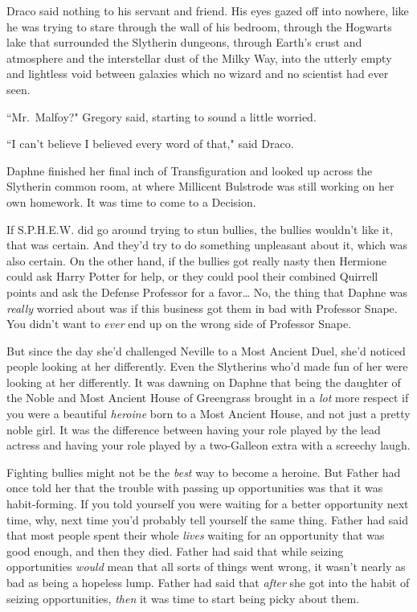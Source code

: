 Draco said nothing to his servant and friend. His eyes gazed off into nowhere, like he was trying to stare through the wall of his bedroom, through the Hogwarts lake that surrounded the Slytherin dungeons, through Earth's crust and atmosphere and the interstellar dust of the Milky Way, into the utterly empty and lightless void between galaxies which no wizard and no scientist had ever seen.

``Mr.~Malfoy?" Gregory said, starting to sound a little worried.

``I can't believe I believed every word of that," said Draco.

\later

Daphne finished her final inch of Transfiguration and looked up across the Slytherin common room, at where Millicent Bulstrode was still working on her own homework. It was time to come to a Decision.

If S.P.H.E.W. did go around trying to stun bullies, the bullies wouldn't like it, that was certain. And they'd try to do something unpleasant about it, which was also certain. On the other hand, if the bullies got really nasty then Hermione could ask Harry Potter for help, or they could pool their combined Quirrell points and ask the Defense Professor for a favor{\ldots} No, the thing that Daphne was \emph{really} worried about was if this business got them in bad with Professor Snape. You didn't want to \emph{ever} end up on the wrong side of Professor Snape.

But since the day she'd challenged Neville to a Most Ancient Duel, she'd noticed people looking at her differently. Even the Slytherins who'd made fun of her were looking at her differently. It was dawning on Daphne that being the daughter of the Noble and Most Ancient House of Greengrass brought in a \emph{lot} more respect if you were a beautiful \emph{heroine} born to a Most Ancient House, and not just a pretty noble girl. It was the difference between having your role played by the lead actress and having your role played by a two-Galleon extra with a screechy laugh.

Fighting bullies might not be the \emph{best} way to become a heroine. But Father had once told her that the trouble with passing up opportunities was that it was habit-forming. If you told yourself you were waiting for a better opportunity next time, why, next time you'd probably tell yourself the same thing. Father had said that most people spent their whole \emph{lives} waiting for an opportunity that was good enough, and then they died. Father had said that while seizing opportunities \emph{would} mean that all sorts of things went wrong, it wasn't nearly as bad as being a hopeless lump. Father had said that \emph{after} she got into the habit of seizing opportunities, \emph{then} it was time to start being picky about them.

